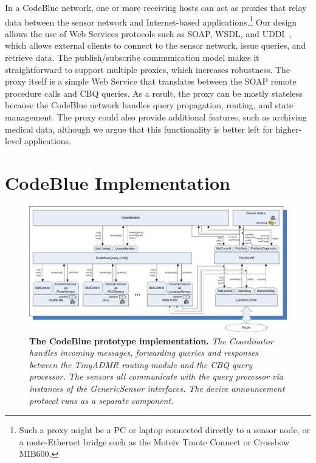 In a CodeBlue network, one or more receiving hosts can act as proxies
that relay data between the sensor network and Internet-based
applications.\footnote{Such a proxy might be a PC or laptop connected
directly to a sensor node, or a mote-Ethernet bridge such as the
Moteiv Tmote Connect or Crossbow MIB600.}  Our design allows the use of Web
Services protocols such as SOAP, WSDL, and
UDDI~\cite{uddi}, which allows external clients to
connect to the sensor network, issue queries, and retrieve data. The
publish/subscribe communication model makes it straightforward to
support multiple proxies, which increases robustness.  The proxy
itself is a simple Web Service that translates between the SOAP remote
procedure calls and CBQ queries. As a result, the proxy can be mostly
stateless because the CodeBlue network handles query propagation,
routing, and state management.  The proxy could also provide
additional features, such as archiving medical data, although we argue
that this functionality is better left for higher-level applications.


\section{CodeBlue Implementation}
\label{sec-cb-impl}

\begin{figure}[t]
\begin{center}
\includegraphics[width=0.95\hsize]{./resources/codeblue-nsdi06/figures/codeBlueArchPatient.pdf}
\end{center}
\caption{\small {\bf The CodeBlue prototype implementation.} {\em The
Coordinator handles incoming messages, forwarding queries and
responses between the TinyADMR routing module and the CBQ query
processor.  The sensors all communicate with the query processor via
instances of the GenericSensor interfaces.  The device announcement
protocol runs as a separate component.}}
\label{fig-codeblue-impl}
\end{figure}


